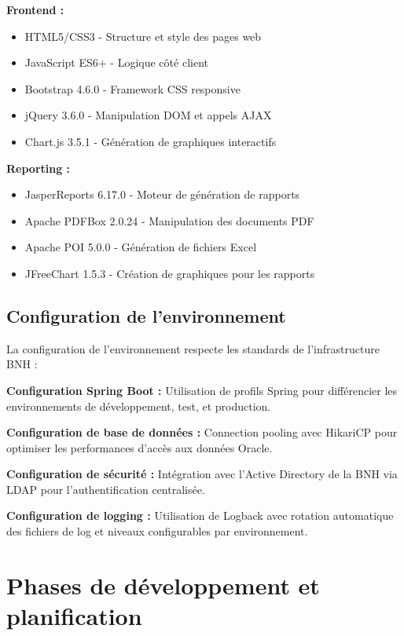 \textbf{Frontend :}
\begin{itemize}
    \item HTML5/CSS3 - Structure et style des pages web
    \item JavaScript ES6+ - Logique côté client
    \item Bootstrap 4.6.0 - Framework CSS responsive
    \item jQuery 3.6.0 - Manipulation DOM et appels AJAX
    \item Chart.js 3.5.1 - Génération de graphiques interactifs
\end{itemize}

\textbf{Reporting :}
\begin{itemize}
    \item JasperReports 6.17.0 - Moteur de génération de rapports
    \item Apache PDFBox 2.0.24 - Manipulation des documents PDF
    \item Apache POI 5.0.0 - Génération de fichiers Excel
    \item JFreeChart 1.5.3 - Création de graphiques pour les rapports
\end{itemize}

\subsection{Configuration de l'environnement}

La configuration de l'environnement respecte les standards de l'infrastructure BNH :

\medskip

\textbf{Configuration Spring Boot :} Utilisation de profils Spring pour différencier les environnements de développement, test, et production.

\textbf{Configuration de base de données :} Connection pooling avec HikariCP pour optimiser les performances d'accès aux données Oracle.

\textbf{Configuration de sécurité :} Intégration avec l'Active Directory de la BNH via LDAP pour l'authentification centralisée.

\textbf{Configuration de logging :} Utilisation de Logback avec rotation automatique des fichiers de log et niveaux configurables par environnement.

\section{Phases de développement et planification}

